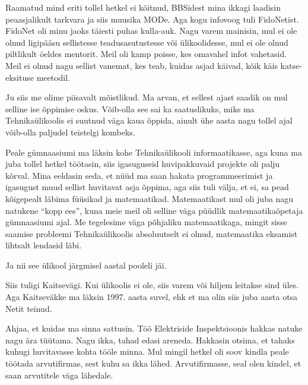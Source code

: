 
Raamatud mind eriti  tollel hetkel ei köitnud, BBSidest mina ikkagi laadisin 
peaasjalikult tarkvara ja siis muusika MODe. Aga kogu infovoog 
tuli FidoNetist. FidoNet oli minu jaoks täiesti puhas kulla-auk. Nagu varem 
mainisin,  mul ei ole olnud ligipääsu sellistesse teadusasutustesse või 
ülikoolidesse,  mul ei ole olnud piltlikult öeldes mentorit. Meil oli kamp 
poisse, kes omavahel  infot vahetasid. Meil ei olnud nagu sellist vanemat, kes 
teab, kuidas asjad käivad,  kõik käis katse-eksituse meetodil.


Ju siis me olime piisavalt mõistlikud. Ma arvan, et sellest ajast saadik on mul 
selline ise õppimise  oskus. Võib-olla see sai ka saatuslikuks, miks ma 
Tehnikaülikoolis ei suutnud väga kaua õppida,  ainult ühe aasta nagu tollel 
ajal võib-olla paljudel teistelgi kombeks.

Peale gümnaasiumi ma läksin kohe Tehnikaülikooli informaatikasse, aga kuna ma juba tollel hetkel töötasin, siis 
igasuguseid huvipakkuvaid projekte oli  palju kõrval. Mina eeldasin seda, et 
nüüd ma saan hakata programmeerimist ja igasugust muud sellist huvitavat asja 
õppima, aga siis tuli välja, et ei,  sa pead kõigepealt läbima füüsikad ja 
matemaatikad. Matemaatikast mul oli juba nagu natukene \enquote{kopp ees}, kuna 
meie meil oli selline väga püüdlik matemaatikaõpetaja gümnaasiumi ajal. Me 
tegelesime väga põhjaliku matemaatikaga, mingit sisse saamise probleemi 
Tehnikaülikoolis  absoluutselt ei olnud,  matemaatika eksamist lihtsalt 
lendasid läbi.

Ja nii see ülikool järgmisel aastal pooleli jäi.


Siis tuligi Kaitsevägi. Kui ülikoolis ei ole, siis varem või 
hiljem leitakse sind üles. Aga  Kaitseväkke ma läksin 1997. aasta suvel, ehk et 
ma olin siis juba aasta otsa Netit teinud. 

Ahjaa, et kuidas ma sinna sattusin. Töö Elektriside Inspektsioonis  hakkas natuke nagu ära tüütama. Nagu ikka,  tahad 
edasi areneda. Hakkasin otsima, et tahaks kuhugi  huvitavasse kohta tööle 
minna.  Mul mingil hetkel oli soov kindla peale töötada arvutifirmas, sest kuhu 
sa ikka lähed. Arvutifirmasse, seal olen kindel, et saan arvutitele väga 
lähedale.

